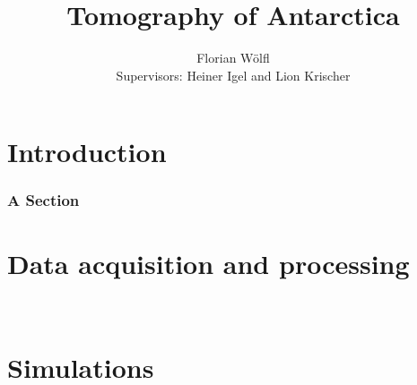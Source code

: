 \documentclass[
  twoside,
  11pt, a4paper,
  footinclude=true,
  headinclude=true,
  cleardoublepage=empty
]{scrbook}
\title{Tomography of Antarctica}
\author{Florian W\"olfl\\
Supervisors: Heiner Igel and Lion Krischer}
\begin{document}
\maketitle







\part{Introduction}



\section{A Section}


\part{Data acquisition and processing}



  
\
\part{Simulations}


    
\end{document}
